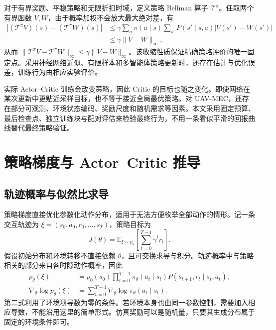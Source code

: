 对于有界奖励、平稳策略和无限折扣时域，定义策略 Bellman 算子 $\mathcal T^\pi$。任取两个有界函数 $V,W$，由于概率加权不会放大最大绝对差，有
\begin{align}
    |(\mathcal T^\pi V)(s)-(\mathcal T^\pi W)(s)|
    &\leq\gamma\sum_a\pi(a\mid s)\sum_{s'}P(s'\mid s,a)|V(s')-W(s')|\\
    &\leq\gamma\|V-W\|_\infty,
    \label{eq:ch2-bellman-contraction}
\end{align}
从而 $\|\mathcal T^\pi V-\mathcal T^\pi W\|_\infty\leq\gamma\|V-W\|_\infty$。该收缩性质保证精确策略评价的唯一固定点。采用神经网络近似、有限样本和多智能体策略更新时，还存在估计与优化误差，训练行为由相应实验评价。

实际 Actor--Critic 训练会改变策略，因此 Critic 的目标也随之变化。即使网络在某次更新中更贴近采样目标，也不等于接近全局最优策略。对 UAV-MEC，还存在部分可观测、环境状态编码、奖励尺度和随机需求等因素。本文采用固定预算、最后检查点、独立训练块与配对评估来检验最终行为，不用一条看似平滑的回报曲线替代最终策略验证。

\section{策略梯度与 Actor--Critic 推导}
\label{sec:ch2-policy-gradient}

\subsection{轨迹概率与似然比求导}
\label{sec:ch2-score-function}

策略梯度直接优化参数化动作分布，适用于无法方便枚举全部动作的情形\cite{williams1992simple}。记一条交互轨迹为 $\xi=(s_0,a_0,r_0,\ldots,s_T)$，策略目标为
\begin{equation}
    J(\theta)=\mathbb E_{\xi\sim p_\theta}\left[\sum_{t=0}^{T-1}\gamma^t r_t\right].
    \label{eq:ch2-objective}
\end{equation}
假设初始分布和环境转移不直接依赖 $\theta$，且可交换求导与积分。轨迹概率中与策略相关的部分来自各时隙动作概率，因此
\begin{align}
    p_\theta(\xi)&=\rho_0(s_0)\prod_{t=0}^{T-1}\pi_\theta(a_t\mid s_t)P(s_{t+1},r_t\mid s_t,a_t),
    \label{eq:ch2-trajectory-density}\\
    \nabla_\theta\log p_\theta(\xi)&=\sum_{t=0}^{T-1}\nabla_\theta\log\pi_\theta(a_t\mid s_t).
    \label{eq:ch2-trajectory-score}
\end{align}
第二式利用了环境项导数为零的条件。若环境本身也由同一参数控制，需要加入相应导数，不能沿用这里的简单形式。仿真奖励可以是随机量，只要其生成分布属于固定的环境条件即可。

